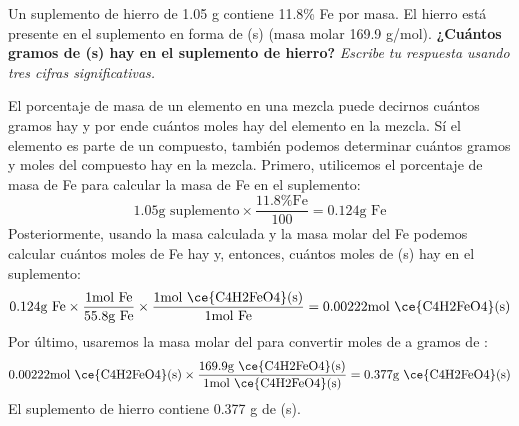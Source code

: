 Un suplemento de hierro de 1.05 g contiene 11.8\% Fe por masa. El hierro está presente en el suplemento en forma de (s) (masa molar 169.9 g/mol).
\textbf{¿Cuántos gramos de (s) hay en el suplemento de hierro?}
\emph{Escribe tu respuesta usando tres cifras significativas.}

\begin{solutionbox}{9cm}
    El porcentaje de masa de un elemento en una mezcla puede decirnos cuántos gramos hay y por ende cuántos moles hay del elemento en la mezcla. Sí el elemento es parte de un compuesto, también podemos determinar cuántos gramos y moles del compuesto hay en la mezcla.
    Primero, utilicemos el porcentaje de masa de Fe para calcular la masa de Fe en el suplemento:
 \[1.05 \text{g suplemento} \times \frac{11.8\text{\% Fe}}{100} = 0.124\text{g Fe}\]
    Posteriormente, usando la masa calculada y la masa molar del Fe podemos calcular cuántos moles de Fe hay y, entonces, cuántos moles de (s) hay en el suplemento:
    \[0.124\text{g Fe} \times \frac{1\text{mol Fe}}{55.8\text{g Fe}} \times \frac{1\text{mol \ce{C4H2FeO4}(s)}}{1\text{mol Fe}} = 0.00222\text{mol \ce{C4H2FeO4}(s)}\]
    Por último, usaremos la masa molar del  para convertir moles de  a gramos de :
    \[0.00222\text{mol \ce{C4H2FeO4}(s)} \times \frac{169.9\text{g \ce{C4H2FeO4}(s)}}{1\text{mol \ce{C4H2FeO4}(s)}} = 0.377\text{g \ce{C4H2FeO4}(s)}\]
    El suplemento de hierro contiene 0.377 g de (s).
\end{solutionbox}